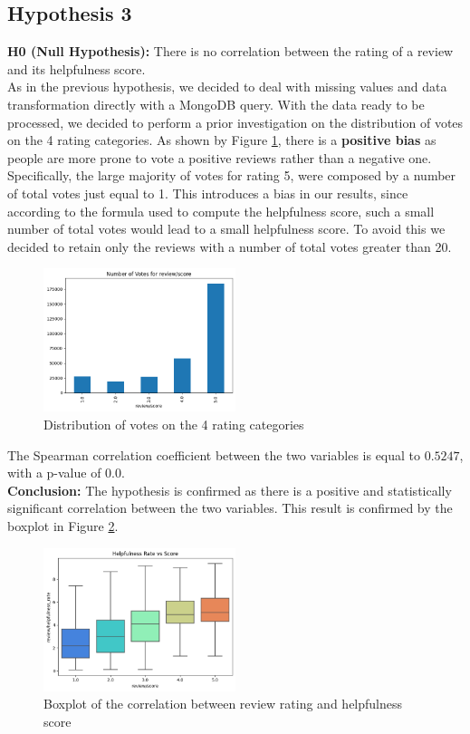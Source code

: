 \subsection*{Hypothesis 3}

\textbf{H0 (Null Hypothesis):} There is no correlation between the rating of a review and its helpfulness score.\\
As in the previous hypothesis, we decided to deal with missing values and data transformation directly with a MongoDB query. With the data ready to
be processed, we decided to perform a prior investigation on the distribution of votes on the 4 rating categories. As shown by Figure \ref{fig:h3_votes_distribution},
there is a \textbf{positive bias} as people are more prone to vote a positive reviews rather than a negative one. Specifically, the large majority of votes
for rating 5, were composed by a number of total votes just equal to 1. This introduces a bias in our results, since according to the formula used 
to compute the helpfulness score, such a small number of total votes would lead to a small helpfulness score.
To avoid this we decided to retain only the reviews with a number of total votes greater than 20.

\begin{figure}[H]
    \centering
    \includegraphics[width=0.5\textwidth]{./figures/h3_votes_distribution.png}
    \caption{Distribution of votes on the 4 rating categories}
    \label{fig:h3_votes_distribution}
\end{figure}
\noindent 
The Spearman correlation coefficient between the two variables is equal to $0.5247$, with a p-value of $0.0$. \\
\textbf{Conclusion:}
The hypothesis is confirmed as there is a positive and statistically significant correlation between the two variables. This result is confirmed by 
the boxplot in Figure \ref{fig:h3_boxplot}.

\begin{figure}[H]
    \centering
    \includegraphics[width=0.5\textwidth]{./figures/h3_boxplot.png}
    \caption{Boxplot of the correlation between review rating and helpfulness score}
    \label{fig:h3_boxplot}
\end{figure}